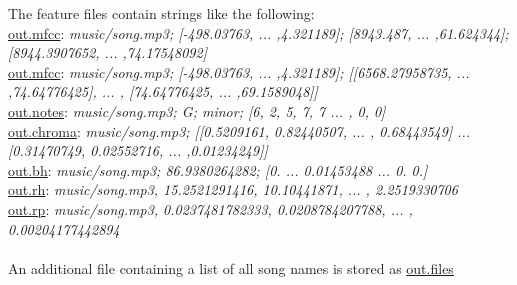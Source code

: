 The feature files contain strings like the following:\\
\underline{out.mfcc}: \textit{music/song.mp3; [-498.03763, ... ,4.321189]; [8943.487, ... ,61.624344]; [8944.3907652, ... ,74.17548092]}\\
\underline{out.mfcc}: \textit{music/song.mp3; [-498.03763, ... ,4.321189]; [[6568.27958735, ... ,74.64776425], ... , [74.64776425, ... ,69.1589048]]}\\
\underline{out.notes}: \textit{music/song.mp3; G; minor; [6, 2, 5, 7, 7 ... , 0, 0]}\\
\underline{out.chroma}: \textit{music/song.mp3; [[0.5209161, 0.82440507, ... , 0.68443549] ... [0.31470749, 0.02552716, ... ,0.01234249]]}\\
\underline{out.bh}: \textit{music/song.mp3; 86.9380264282; [0. ... 0.01453488 ...  0.  0.]}\\
\underline{out.rh}: \textit{music/song.mp3, 15.2521291416, 10.10441871, ... , 2.2519330706}\\
\underline{out.rp}: \textit{music/song.mp3, 0.0237481782333, 0.0208784207788, ... , 0.00204177442894}\\
\ \\
An additional file containing a list of all song names is stored as \underline{out.files}